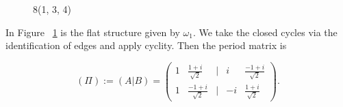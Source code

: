 \documentclass[12pt,reqno]{amsart}
\DeclareMathOperator{\Aut}{Aut}
\theoremstyle{definition}
\theoremstyle{remark}
\begin{document}
\begin{figure}[htbp]
    \centering
    \qquad
    \caption{8(1, 3, 4)}%
    \label{fig:134}%
\end{figure}

In Figure~ \cref{fig:134} is the flat structure given by $\omega_1.$ We take the closed cycles via the identification of edges and apply cyclity. Then the period matrix is 

$$(\Pi) := (A | B) = \begin{pmatrix}1 & \frac{1 + i}{\sqrt{2}} & | & i & \frac{-1 + i}{\sqrt{2}}\\
1 & \frac{-1 + i}{\sqrt{2}} & | & -i & \frac{1 + i}{\sqrt{2}} \end{pmatrix}.$$


\end{document}
